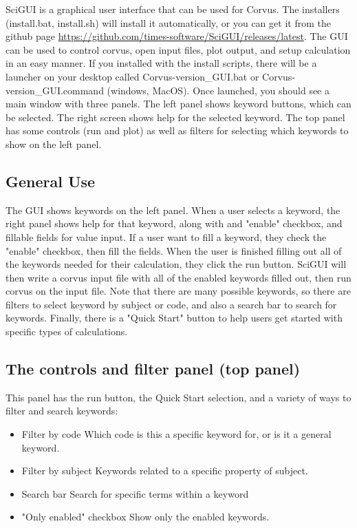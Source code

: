 SciGUI is a graphical user interface that can be used for Corvus. 
The installers (install.bat, install.sh) will install it automatically,
or you can get it from the github page \url{https://github.com/times-software/SciGUI/releases/latest}.
The GUI can be used to control corvus, open input files, plot output, and setup calculation
in an easy manner. If you installed with the install scripts, there will be a launcher
on your desktop called Corvus-version\_GUI.bat or Corvus-version\_GUI.command (windows, MacOS).
Once launched, you should see a main window with three panels. The left panel shows keyword buttons, which 
can be selected. The right screen shows help for the selected keyword. The top panel has some controls (run and plot) 
as well as filters for selecting which keywords to show on the left panel.

\subsection{General Use}
The GUI shows keywords on the left panel. When a user selects a keyword, 
the right panel shows help for that keyword, along with and "enable" checkbox,
and fillable fields for value input. If a user want to fill a keyword, they 
check the "enable" checkbox, then fill the fields. When the user is finished 
filling out all of the keywords needed for their calculation, they click the run
button. SciGUI will then write a corvus input file with all of the enabled keywords
filled out, then run corvus on the input file. Note that there are many possible
keywords, so there are filters to select keyword by subject or code, and also a search
bar to search for keywords. Finally, there is a "Quick Start" button to help users
get started with specific types of calculations.

\subsection{The controls and filter panel (top panel)}
This panel has the run button, the Quick Start selection, and a variety of ways to filter and search keywords:
\begin{itemize}
\item Filter by code
Which code is this a specific keyword for, or is it a general keyword.
\item Filter by subject
Keywords related to a specific property of subject.
\item Search bar
Search for specific terms within a keyword
\item "Only enabled" checkbox
Show only the enabled keywords.
\end{itemize}

